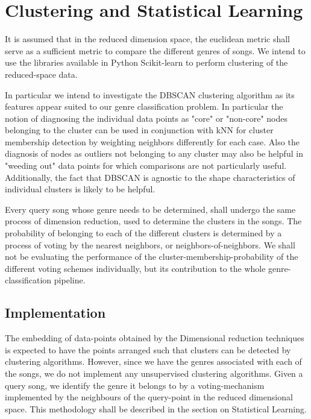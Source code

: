 \documentclass[12pt]{article}
\begin{document}
\section{Clustering and Statistical Learning}
It is assumed that in the reduced dimension space, the euclidean metric shall serve as a sufficient metric to compare the different genres of songs. We intend to use the libraries available in Python Scikit-learn \cite{scikitlearn} to perform clustering of the reduced-space data.

In particular we intend to investigate the DBSCAN clustering algorithm as its features appear suited to our genre classification problem.  In particular the notion of diagnosing the individual data points as "core" or "non-core" nodes belonging to the cluster can be used in conjunction with kNN for cluster membership detection by weighting neighbors differently for each case.  Also the diagnosis of nodes as outliers not belonging to any cluster may also be helpful in "weeding out" data points for which comparisons are not particularly useful.  Additionally, the fact that DBSCAN is agnostic to the shape characteristics of individual clusters is likely to be helpful.

Every query song whose genre needs to be determined, shall undergo the same process of dimension reduction, used to determine the clusters in the songs. The probability of belonging to each of the different clusters is determined by a process of voting by the nearest neighbors, or neighbors-of-neighbors. We shall not be evaluating the performance of the cluster-membership-probability of the different voting schemes individually, but its contribution to the whole genre-classification pipeline. 

\subsection{Implementation}
The embedding of data-points obtained by the Dimensional reduction techniques is expected to have the points arranged such that clusters can be detected by clustering algorithms. However, since we have the genres associated with each of the songs, we do not implement any unsupervised clustering algorithms. Given a query song, we identify the genre it belongs to by a voting-mechanism implemented by the neighbours of the query-point in the reduced dimensional space. This methodology shall be described in the section on Statistical Learning. 
\end{document}
